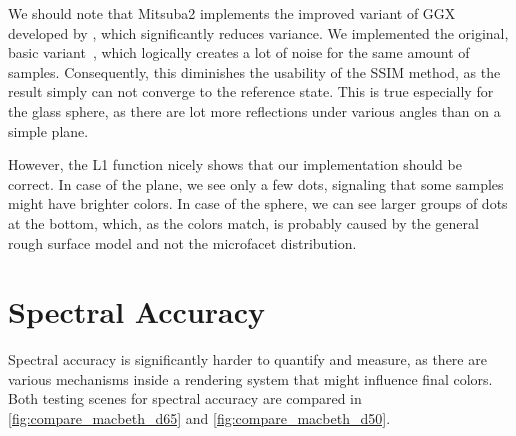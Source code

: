 We should note that Mitsuba2 implements the improved variant of GGX developed by \citet{heitz2018sampling}, which significantly reduces variance. We implemented the original, basic variant~\cite{walter2007microfacet}, which logically creates a lot of noise for the same amount of samples. Consequently, this diminishes the usability of the SSIM method, as the result simply can not converge to the reference state. This is true especially for the glass sphere, as there are lot more reflections under various angles than on a simple plane.

However, the L1 function nicely shows that our implementation should be correct. In case of the plane, we see only a few dots, signaling that some samples might have brighter colors. In case of the sphere, we can see larger groups of dots at the bottom, which, as the colors match, is probably caused by the general rough surface model and not the microfacet distribution.

\section{Spectral Accuracy}

Spectral accuracy is significantly harder to quantify and measure, as there are various mechanisms inside a rendering system that might influence final colors. Both testing scenes for spectral accuracy are compared in \autoref{fig:compare_macbeth_d65} and \autoref{fig:compare_macbeth_d50}.


